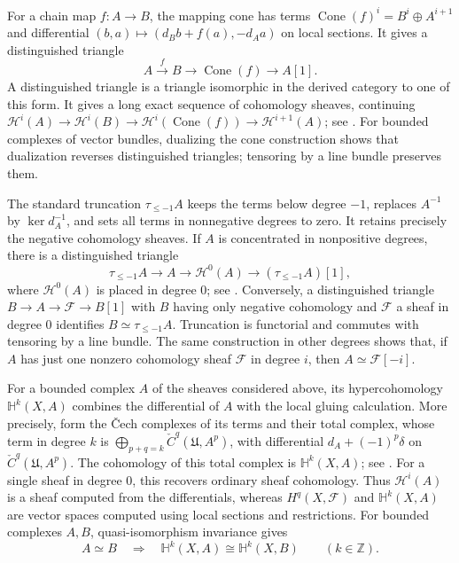 \documentclass[12pt,reqno,a4paper]{amsart}
\numberwithin{equation}{section}
\numberwithin{figure}{section}
\theoremstyle{plain}
\theoremstyle{definition}
\begin{document}
For a chain map $f:A\to B$, the mapping cone has terms
$\operatorname{Cone}(f)^i=B^i\oplus A^{i+1}$ and differential
$(b,a)\mapsto(d_Bb+f(a),-d_Aa)$ on local sections.
It gives a distinguished triangle
\begin{equation}\label{app:eq:cone-triangle}
 A\xrightarrow{f}B\longrightarrow\operatorname{Cone}(f)
       \longrightarrow A[1].
\end{equation}
A distinguished triangle is a triangle isomorphic in the derived
category to one of this form. It gives a long exact sequence of
cohomology sheaves, continuing
$\mathcal H^i(A)\to\mathcal H^i(B)\to
\mathcal H^i(\operatorname{Cone}(f))\to\mathcal H^{i+1}(A)$;
see \cite[Tags~014E and~05RR]{Stacks}.
For bounded complexes of vector bundles, dualizing the cone
construction shows that dualization reverses distinguished triangles;
tensoring by a line bundle preserves them.

The standard truncation $\tau_{\leq-1}A$ keeps the terms below degree
$-1$, replaces $A^{-1}$ by $\ker d_A^{-1}$, and sets all terms in
nonnegative degrees to zero. It retains precisely the negative
cohomology sheaves. If $A$ is concentrated in nonpositive degrees,
there is a distinguished triangle
\begin{equation}\label{app:eq:truncation-triangle}
 \tau_{\leq-1}A\longrightarrow A\longrightarrow\mathcal H^0(A)
       \longrightarrow(\tau_{\leq-1}A)[1],
\end{equation}
where $\mathcal H^0(A)$ is placed in degree $0$;
see \cite[Tag~08J5, Remark~13.12.4]{Stacks}.
Conversely, a distinguished triangle $B\to A\to\mathcal F\to B[1]$
with $B$ having only negative cohomology and $\mathcal F$ a sheaf
in degree $0$ identifies $B\simeq\tau_{\leq-1}A$.
Truncation is functorial and commutes with tensoring by a line bundle.
The same construction in other degrees shows that, if $A$ has just
one nonzero cohomology sheaf $\mathcal F$ in degree $i$, then
$A\simeq\mathcal F[-i]$.

For a bounded complex $A$ of the sheaves considered above, its
hypercohomology $\mathbb H^k(X,A)$ combines the differential of $A$
with the local gluing calculation. More precisely, form the
\v Cech complexes of its terms and their total complex, whose term
in degree $k$ is
$\bigoplus_{p+q=k}\check C^q(\mathfrak U,A^p)$, with differential
$d_A+(-1)^p\delta$ on $\check C^q(\mathfrak U,A^p)$.
The cohomology of this total complex is $\mathbb H^k(X,A)$;
see \cite[Tags~01XD and~01FP]{Stacks}.
For a single sheaf in degree $0$, this recovers ordinary sheaf
cohomology. Thus $\mathcal H^i(A)$ is a sheaf computed from the
differentials, whereas $H^q(X,\mathcal F)$ and $\mathbb H^k(X,A)$
are vector spaces computed using local sections and restrictions.
For bounded complexes $A,B$, quasi-isomorphism invariance gives
\begin{equation}\label{app:eq:hypercohomology-invariance}
 A\simeq B\quad\Longrightarrow\quad
 \mathbb H^k(X,A)\cong\mathbb H^k(X,B)\qquad(k\in\mathbb Z).
\end{equation}
\end{document}
